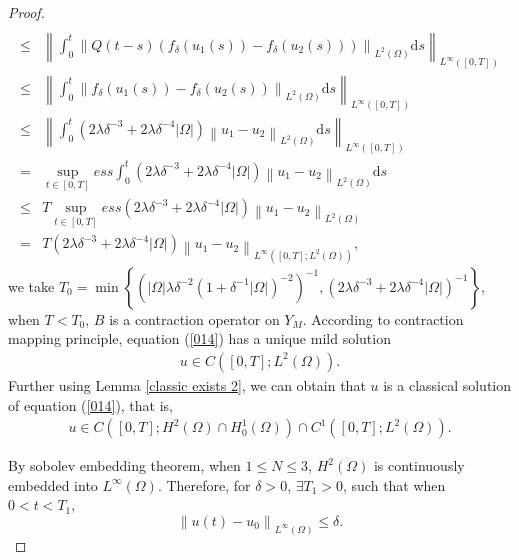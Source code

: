 \documentclass{article}
\numberwithin{equation}{section}
\begin{document}
\begin{proof}
\begin{equation*}
\begin{aligned}
    \\ \le &  \left\|\int_{0}^{t} \left\|Q(t-s) \left( f_{\delta}(u_1(s)) - f_{\delta}(u_2(s))\right)  \right\|_{ L^{2}\left(\Omega\right)} \mathrm{d} s \right\|_{L^{\infty}\left([0, T] \right)}
    \\ \le &  \left\|\int_{0}^{t} \left\| f_{\delta}(u_1(s)) - f_{\delta}(u_2(s))  \right\|_{ L^{2}\left(\Omega\right)} \mathrm{d} s \right\|_{L^{\infty}\left([0, T] \right)}
    \\ \le &  \left\|\int_{0}^{t}  \left( 2\lambda\delta^{-3} + 2\lambda\delta^{-4}|\Omega|\right)\left\|u_1-u_2\right\|_{ L^{2}\left(\Omega\right)} \mathrm{d} s \right\|_{L^{\infty}\left([0, T] \right)}
    \\ = &  \sup_{t\in [0, T]}ess \int_{0}^{t}  \left( 2\lambda\delta^{-3} + 2\lambda\delta^{-4}|\Omega|\right)\left\|u_1-u_2\right\|_{ L^{2}\left(\Omega\right)} \mathrm{d} s
    \\ \le &  T\sup_{t\in [0, T]}ess    \left( 2\lambda\delta^{-3} + 2\lambda\delta^{-4}|\Omega|\right)\left\|u_1-u_2\right\|_{ L^{2}\left(\Omega\right)}
    \\ = &  T  \left( 2\lambda\delta^{-3} + 2\lambda\delta^{-4}|\Omega|\right)\left\|u_1-u_2\right\|_{L^{\infty}\left([0, T] ; L^{2}(\Omega)\right)},
    \end{aligned}
    \end{equation*}
    we take $T_0=\min\left\{\left(|\Omega|\lambda\delta^{-2}
    \left(1+\delta^{-1}|\Omega|\right)^{-2}\right)^{-1},
    \left( 2\lambda\delta^{-3} + 2\lambda\delta^{-4}|\Omega|\right)^{-1}\right\}$, when $T<T_0$, $B$ is a contraction operator on $Y_{M}$. According to contraction mapping principle, equation (\ref{014}) has a unique mild solution
    \begin{equation*}
    \begin{aligned}
     u \in C\left([0, T];  L^{2}(\Omega)\right).
    \end{aligned}
    \end{equation*}
    Further using Lemma \ref{classic exists 2}, we can obtain that $u$ is a classical solution of equation (\ref{014}), that is,
    \begin{equation*}
    \begin{aligned}
        u \in C\left([0, T]; H^{2}(\Omega) \cap H_{0}^{1}(\Omega)\right) \cap C^{1}\left([0, T];  L^{2}(\Omega)\right).
    \end{aligned}
    \end{equation*}

    By sobolev embedding theorem, when $1\le N\le 3$, $H^2(\Omega)$ is continuously embedded into $L^{\infty}(\Omega)$. Therefore, for $\delta >0$, $\exists T_{1}>0$, such that when $0<t<T_{1}$,
    \begin{equation*}
    \left\| u(t)-u_0\right\|_{ L^{\infty}\left(\Omega\right)}
    \le \delta.
    \end{equation*}


\end{proof}
\end{document}
